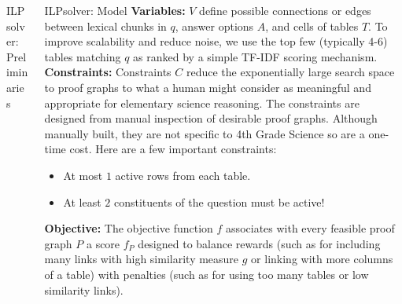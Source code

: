 \documentclass[final]{beamer}
\newlength{\onecolwid}
\newlength{\twocolwid}
\begin{document}
\begin{frame}[t]
\begin{columns}[t]
\begin{column}{\twocolwid}
\begin{columns}[t,totalwidth=\twocolwid]
\begin{column}{\onecolwid}
\begin{block}{ILPsolver: Preliminaries}
\end{block}


\end{column} %

\begin{column}{\onecolwid}\vspace{-.6in} %

\begin{block}{ILPsolver: Model}
	\textbf{Variables:} $V$ define possible connections or edges between
	lexical chunks in $q$, answer options $A$, and cells of tables $T$. To improve scalability and reduce noise, we use the top few (typically 4-6) tables matching $q$ as ranked by a  simple TF-IDF scoring mechanism. \\
	\textbf{Constraints:} 
	Constraints $C$ reduce the exponentially large search space
	to proof graphs to what a human might consider as meaningful and appropriate for elementary science reasoning.
	The constraints are designed from manual
	inspection of desirable proof graphs. Although manually
	built, they are not specific to 4th Grade Science so are a
	one-time cost. Here are a few important constraints: 
\begin{itemize}
	\small 
	\item At most $1$ active rows  from each table. 
	\item At least $2$ constituents of the question must be active! 
\end{itemize}
	\textbf{Objective:} The objective function $f$ associates with every feasible
	proof graph $P$ a score $f_P$ designed to balance rewards (such as for including many links with high similarity	measure $g$ or linking with more columns of a table) with penalties (such as for using too many tables or low similarity links).

		

\end{block}
\end{column}
\end{columns}
\end{column}
\end{columns}
\end{frame}
\end{document}
